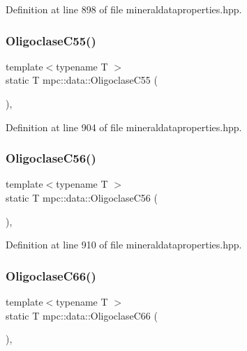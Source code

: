 Definition at line 898 of file mineraldataproperties.\+hpp.

\mbox{\label{namespacempc_1_1data_a22a93ecb7cf979d8825334eaaedbe60e}} 
\subsubsection{\texorpdfstring{Oligoclase\+C55()}{OligoclaseC55()}}
{\footnotesize\ttfamily template$<$typename T $>$ \\
static T mpc\+::data\+::\+Oligoclase\+C55 (\begin{DoxyParamCaption}{ }\end{DoxyParamCaption})\hspace{0.3cm}{\ttfamily [inline]}, {\ttfamily [static]}}



Definition at line 904 of file mineraldataproperties.\+hpp.

\mbox{\label{namespacempc_1_1data_ae3a76797a25aa94f89e94ed74f3a804a}} 
\subsubsection{\texorpdfstring{Oligoclase\+C56()}{OligoclaseC56()}}
{\footnotesize\ttfamily template$<$typename T $>$ \\
static T mpc\+::data\+::\+Oligoclase\+C56 (\begin{DoxyParamCaption}{ }\end{DoxyParamCaption})\hspace{0.3cm}{\ttfamily [inline]}, {\ttfamily [static]}}



Definition at line 910 of file mineraldataproperties.\+hpp.

\mbox{\label{namespacempc_1_1data_a2dd85fb6eaf535a632672bba37d56620}} 
\subsubsection{\texorpdfstring{Oligoclase\+C66()}{OligoclaseC66()}}
{\footnotesize\ttfamily template$<$typename T $>$ \\
static T mpc\+::data\+::\+Oligoclase\+C66 (\begin{DoxyParamCaption}{ }\end{DoxyParamCaption})\hspace{0.3cm}{\ttfamily [inline]}, {\ttfamily [static]}}



